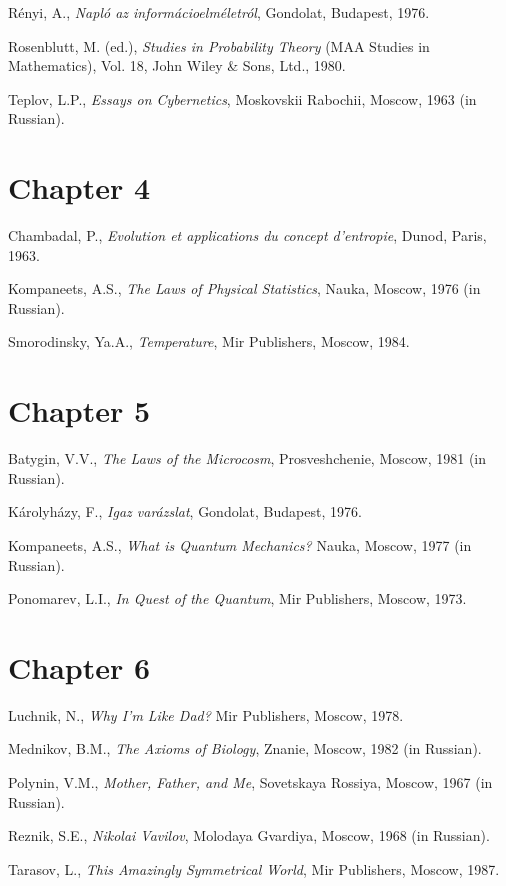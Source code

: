 {R\'enyi, A., \emph{Napl\'o az inform\'acioelm\'eletr\'ol}, Gondolat, Budapest, 1976.

Rosenblutt, M. (ed.), \emph{Studies in Probability Theory} (MAA Studies in Mathematics), Vol. 18, John Wiley \& Sons, Ltd., 1980.

Teplov, L.P., \emph{Essays on Cybernetics}, Moskovskii Rabochii, Moscow, 1963 (in Russian).

\section*{Chapter 4}

Chambadal, P., \emph{Evolution et applications du concept d'entropie}, Dunod, Paris, 1963.

Kompaneets, A.S., \emph{The Laws of Physical Statistics}, Nauka, Moscow, 1976 (in Russian).

Smorodinsky, Ya.A., \emph{Temperature}, Mir Publishers, Moscow, 1984.

\section*{Chapter 5}


Batygin, V.V., \emph{The Laws of the Microcosm}, Prosveshchenie, Moscow, 1981 (in Russian).

K\'arolyh\'azy, F., \emph{Igaz var\'azslat}, Gondolat, Budapest, 1976.

Kompaneets, A.S., \emph{What is Quantum Mechanics?} Nauka, Moscow, 1977 (in Russian).

Ponomarev, L.I., \emph{In Quest of the Quantum}, Mir Publishers, Moscow, 1973.

\section*{Chapter 6}

Luchnik, N., \emph{Why I'm Like Dad?} Mir Publishers, Moscow, 1978.

Mednikov, B.M., \emph{The Axioms of Biology}, Znanie, Moscow, 1982 (in Russian).

Polynin, V.M., \emph{Mother, Father, and Me}, Sovetskaya Rossiya, Moscow, 1967 (in Russian).

Reznik, S.E., \emph{Nikolai Vavilov}, Molodaya Gvardiya, Moscow, 1968 (in Russian).

Tarasov, L., \emph{This Amazingly Symmetrical World}, Mir Publishers, Moscow, 1987.
}
